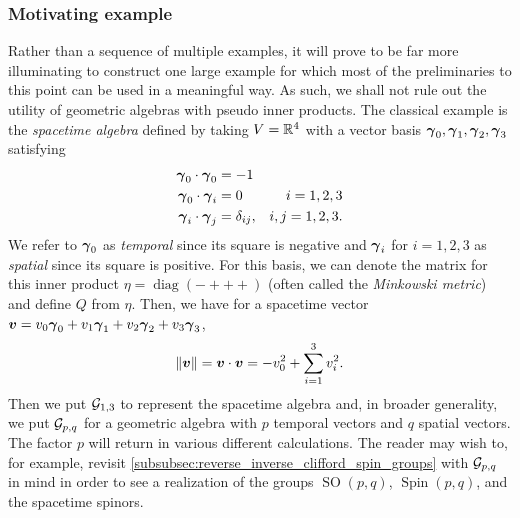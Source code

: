 \subsubsection{Motivating example}
\label{subsubsec:motivating_example}

Rather than a sequence of multiple examples, it will prove to be far more illuminating to construct one large example for which most of the preliminaries to this point can be used in a meaningful way. As such, we shall not rule out the utility of geometric algebras with pseudo inner products. The classical example is the \emph{spacetime algebra} defined by taking $V=\mathbb{R}^4$ with a vector basis $\boldsymbol{\gamma}_0,\boldsymbol{\gamma}_1,\boldsymbol{\gamma}_2,\boldsymbol{\gamma}_3$ satisfying
\begin{subequations}
\begin{align}
\boldsymbol{\gamma}_0 \cdot \boldsymbol{\gamma}_0 &= -1\\
\boldsymbol{\gamma}_0 \cdot \boldsymbol{\gamma}_i &= 0  &i=1,2,3\\
\boldsymbol{\gamma}_i \cdot \boldsymbol{\gamma}_j &= \delta_{ij}, &i,j=1,2,3.
\end{align}
\end{subequations}
We refer to $\boldsymbol{\gamma}_0$ as \emph{temporal} since its square is negative and $\boldsymbol{\gamma}_i$ for $i=1,2,3$ as \emph{spatial} since its square is positive. For this basis, we can denote the matrix for this inner product $\eta =\operatorname{diag}(-+++)$ (often called the \emph{Minkowski metric}) and define $Q$ from $\eta$. Then, we have for a spacetime vector $\boldsymbol{v} = v_0 \boldsymbol{\gamma}_0 +v_1 \boldsymbol{\gamma}_1 + v_2 \boldsymbol{\gamma}_2 + v_3 \boldsymbol{\gamma}_3$,
\begin{equation}
\label{eq:spacetime_inner_product}
\|\boldsymbol{v}\| = \boldsymbol{v} \cdot \boldsymbol{v} = -v_0^2 + \sum_{i=1}^3 v_i^2.
\end{equation}
Then we put $\mathcal{G}_{1,3}$ to represent the spacetime algebra and, in broader generality, we put $\mathcal{G}_{p,q}$ for a geometric algebra with $p$ temporal vectors and $q$ spatial vectors. The factor $p$ will return in various different calculations. The reader may wish to, for example, revisit \cref{subsubsec:reverse_inverse_clifford_spin_groups} with $\mathcal{G}_{p,q}$ in mind in order to see a realization of the groups $\operatorname{SO}(p,q)$, $\operatorname{Spin}(p,q)$, and the spacetime spinors. 

